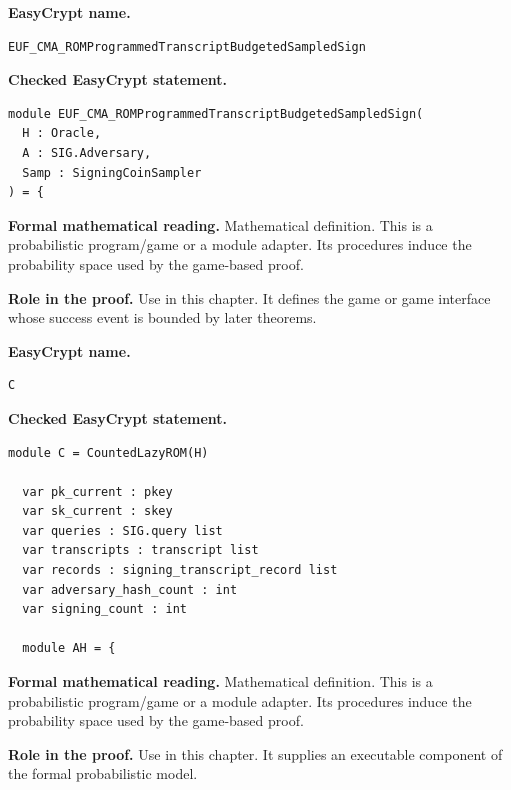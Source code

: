\begin{formaldefinition}
\noindent\textbf{EasyCrypt name.}
\begin{lstlisting}[language=EasyCrypt,basicstyle=\ttfamily\scriptsize]
EUF_CMA_ROMProgrammedTranscriptBudgetedSampledSign
\end{lstlisting}
\noindent\textbf{Checked EasyCrypt statement.}
\begin{lstlisting}[language=EasyCrypt,basicstyle=\ttfamily\scriptsize]
module EUF_CMA_ROMProgrammedTranscriptBudgetedSampledSign(
  H : Oracle,
  A : SIG.Adversary,
  Samp : SigningCoinSampler
) = {
\end{lstlisting}
\noindent\textbf{Formal mathematical reading.}
Mathematical definition. This is a probabilistic program/game or a module adapter.  Its procedures induce the probability space used by the game-based proof.

\noindent\textbf{Role in the proof.}
Use in this chapter. It defines the game or game interface whose success event is bounded by later theorems.

\end{formaldefinition}

\begin{formaldefinition}
\noindent\textbf{EasyCrypt name.}
\begin{lstlisting}[language=EasyCrypt,basicstyle=\ttfamily\scriptsize]
C
\end{lstlisting}
\noindent\textbf{Checked EasyCrypt statement.}
\begin{lstlisting}[language=EasyCrypt,basicstyle=\ttfamily\scriptsize]
module C = CountedLazyROM(H)

  var pk_current : pkey
  var sk_current : skey
  var queries : SIG.query list
  var transcripts : transcript list
  var records : signing_transcript_record list
  var adversary_hash_count : int
  var signing_count : int

  module AH = {
\end{lstlisting}
\noindent\textbf{Formal mathematical reading.}
Mathematical definition. This is a probabilistic program/game or a module adapter.  Its procedures induce the probability space used by the game-based proof.

\noindent\textbf{Role in the proof.}
Use in this chapter. It supplies an executable component of the formal probabilistic model.

\end{formaldefinition}

